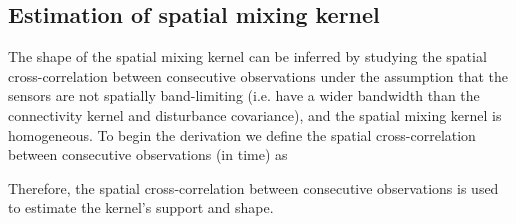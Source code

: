 \documentclass[10pt,twocolumn,twoside]{IEEEtran}
\begin{document}
\subsection{Estimation of spatial mixing kernel} 
The shape of the spatial mixing kernel can be inferred by studying the spatial cross-correlation between consecutive observations under the assumption that the sensors are not spatially band-limiting (i.e.
have a wider bandwidth than the connectivity kernel and disturbance covariance), and the spatial mixing kernel is homogeneous.
To begin the derivation we define the spatial cross-correlation between consecutive observations (in time) as  

Therefore, the spatial cross-correlation between consecutive observations is used to estimate the kernel's support and shape.
\end{document}
